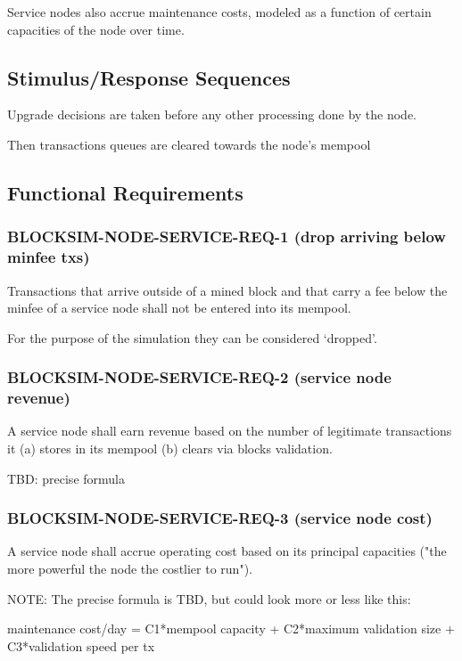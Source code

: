 \documentclass{scrreprt}
\begin{document}
Service nodes also accrue maintenance costs, modeled as a function of certain
capacities of the node over time.


\subsection{Stimulus/Response Sequences}

Upgrade decisions are taken before any other processing done by the node.

Then transactions queues are cleared towards the node's mempool

\subsection{Functional Requirements}

\subsubsection{BLOCKSIM-NODE-SERVICE-REQ-1 (drop arriving below minfee txs)}

Transactions that arrive outside of a mined block and that carry a fee below
the minfee of a service node shall not be entered into its mempool.

For the purpose of the simulation they can be considered `dropped'.


\subsubsection{BLOCKSIM-NODE-SERVICE-REQ-2 (service node revenue)}

A service node shall earn revenue based on the number of legitimate
transactions it (a) stores in its mempool  (b) clears via blocks validation.

TBD: precise formula

\subsubsection{BLOCKSIM-NODE-SERVICE-REQ-3 (service node cost)}

A service node shall accrue operating cost based on its principal
capacities ("the more powerful the node the costlier to run").

NOTE: The precise formula is TBD, but could look more or less like this:

maintenance cost/day = C1*mempool capacity + C2*maximum validation size + C3*validation speed per tx
\end{document}

